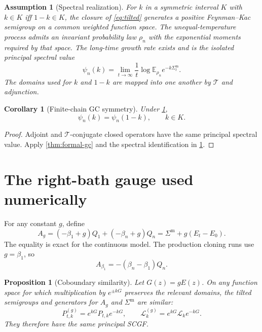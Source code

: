 \documentclass[11pt]{article}
\newtheorem{proposition}[theorem]{Proposition}
\newtheorem{corollary}[theorem]{Corollary}
\newtheorem{assumption}[theorem]{Assumption}
\theoremstyle{remark}
\newcommand{\E}{\mathbb E}
\newcommand{\cL}{\mathcal L}
\newcommand{\Thetaop}{\mathcal T}
\newcommand{\SigmaM}{\Sigma^{\mathrm m}}
\begin{document}
\begin{assumption}[Spectral realization]\label{ass:spectral}
For $k$ in a symmetric interval $K$ with $k\in K$ iff $1-k\in K$, the closure
of \eqref{eq:tilted} generates a positive Feynman--Kac semigroup on a common
weighted function space.  The unequal-temperature process admits an invariant
probability law $\rho_n$ with the exponential moments required by that space.
The long-time growth rate exists and is the isolated
principal spectral value
\begin{equation}\label{eq:scgf}
 \psi_n(k)=\lim_{t\to\infty}\frac1t
 \log\E_{\rho_n}e^{-k\SigmaM_t}.
\end{equation}
The domains used for $k$ and $1-k$ are mapped into one another by
$\Thetaop$ and adjunction.
\end{assumption}

\begin{corollary}[Finite-chain GC symmetry]\label{cor:finite-gc}
Under \cref{ass:spectral},
\begin{equation}\label{eq:gc}
 \boxed{\psi_n(k)=\psi_n(1-k),\qquad k\in K.}
\end{equation}
\end{corollary}

\begin{proof}
Adjoint and $\Thetaop$-conjugate closed operators have the same principal
spectral value.  Apply \cref{thm:formal-gc} and the spectral identification in
\cref{ass:spectral}.
\end{proof}

\section{The right-bath gauge used numerically}

For any constant $g$, define
\[
 A_g=(-\beta_1+g)Q_1+(-\beta_n+g)Q_n
     =\SigmaM+g(E_t-E_0).
\]
The equality is exact for the continuous model.  The production cloning runs
use $g=\beta_1$, so
\begin{equation}\label{eq:right-gauge}
 A_{\beta_1}=-(\beta_n-\beta_1)Q_n.
\end{equation}

\begin{proposition}[Coboundary similarity]\label{prop:gauge}
Let $G(z)=gE(z)$.  On any function space for which multiplication by
$e^{\pm kG}$ preserves the relevant domains, the tilted semigroups and
generators for $A_g$ and $\SigmaM$ are similar:
\begin{equation}\label{eq:gauge-similarity}
 P^{(g)}_{t,k}=e^{kG}P_{t,k}e^{-kG},
 \qquad
 \cL^{(g)}_k=e^{kG}\cL_ke^{-kG}.
\end{equation}
They therefore have the same principal SCGF.
\end{proposition}
\end{document}
